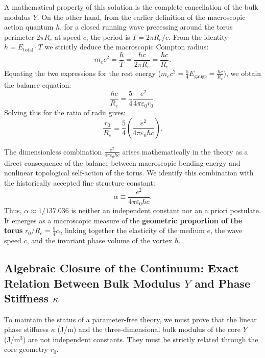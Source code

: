 \documentclass[11pt,a4paper]{article}
\begin{document}
A mathematical property of this solution is the complete cancellation of the bulk modulus $Y$.
On the other hand, from the earlier definition of the macroscopic action quantum $h$, for a closed running wave precessing around the torus perimeter $2\pi R_e$ at speed $c$, the period is $T = 2\pi R_e/c$. From the identity $h = E_{\text{total}} \cdot T$ we strictly deduce the macroscopic Compton radius:
\begin{equation}
m_e c^2 = \frac{h}{T} = \frac{h c}{2\pi R_e} = \frac{\hbar c}{R_e}.
\end{equation}
Equating the two expressions for the rest energy ($m_e c^2 = \frac{5}{4} E_{\text{gauge}} = \frac{\hbar c}{R_e}$), we obtain the balance equation:
\begin{equation}
\frac{\hbar c}{R_e} = \frac{5}{4} \frac{e^2}{4\pi\varepsilon_0 r_0}.
\end{equation}
Solving this for the ratio of radii gives:
\begin{equation}
\frac{r_0}{R_e} = \frac{5}{4} \left( \frac{e^2}{4\pi\varepsilon_0 \hbar c} \right).
\label{alpha_derivation}
\end{equation}

The dimensionless combination $\frac{e^2}{4\pi\varepsilon_0 \hbar c}$ arises mathematically in the theory as a direct consequence of the balance between macroscopic bending energy and nonlinear topological self-action of the torus.
We identify this combination with the historically accepted fine structure constant:
\begin{equation}
\alpha \equiv \frac{e^2}{4\pi\varepsilon_0 \hbar c}.
\end{equation}
Thus, $\alpha \approx 1/137.036$ is neither an independent constant nor an a priori postulate. It emerges as a macroscopic measure of the \textbf{geometric proportion of the torus} $r_0/R_e = \frac{5}{4}\alpha$, linking together the elasticity of the medium $e$, the wave speed $c$, and the invariant phase volume of the vortex $\hbar$.

\subsection{Algebraic Closure of the Continuum: Exact Relation Between Bulk Modulus $Y$ and Phase Stiffness $\kappa$}
To maintain the status of a parameter-free theory, we must prove that the linear phase stiffness $\kappa$ (J/m) and the three-dimensional bulk modulus of the core $Y$ (J/m$^3$) are not independent constants. They must be strictly related through the core geometry $r_0$.
\end{document}
